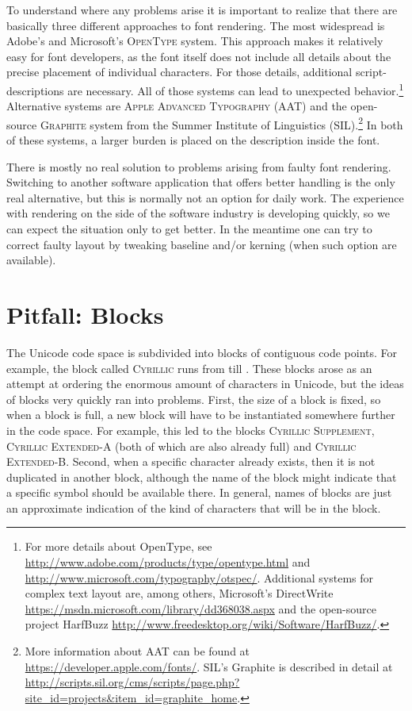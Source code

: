 To understand where any problems arise it is important to realize that there are
basically three different approaches to font rendering. The most widespread is
Adobe's and Microsoft's \textsc{OpenType} system. This approach makes it
relatively easy for font developers, as the font itself does not include all
details about the precise placement of individual characters. For those details,
additional script-descriptions are necessary. All of those systems can lead to
unexpected behavior.\footnote{For more details about OpenType, see
\url{http://www.adobe.com/products/type/opentype.html} and
\url{http://www.microsoft.com/typography/otspec/}. Additional systems for
complex text layout are, among others, Microsoft's DirectWrite
\url{https://msdn.microsoft.com/library/dd368038.aspx} and the open-source
project HarfBuzz \url{http://www.freedesktop.org/wiki/Software/HarfBuzz/}.}
Alternative systems are \textsc{Apple Advanced Typography} (AAT) and the
open-source \textsc{Graphite} system from the Summer Institute of Linguistics
(SIL).\footnote{More information about AAT can be found at
\url{https://developer.apple.com/fonts/}. \newline SIL's Graphite is described
in detail at
\url{http://scripts.sil.org/cms/scripts/page.php?site\_id=projects\&item\_id=graphite\_home}.}
In both of these systems, a larger burden is placed on the description inside
the font.

There is mostly no real solution to problems arising from faulty font rendering.
Switching to another software application that offers better handling is the
only real alternative, but this is normally not an option for daily work. The 
experience with rendering on the side of the software industry is developing 
quickly, so we can expect the situation only to get better. In the meantime one 
can try to correct faulty layout by tweaking baseline and/or kerning (when such 
option are available).

\section{Pitfall: Blocks}
\label{pitfall-blocks}

The Unicode code space is subdivided into blocks of contiguous code points. For
example, the block called \textsc{Cyrillic} runs from  till
. These blocks arose as an attempt at ordering the enormous amount of
characters in Unicode, but the ideas of blocks very quickly ran into problems.
First, the size of a block is fixed, so when a block is full, a new block will
have to be instantiated somewhere further in the code space. For example, this
led to the blocks \textsc{Cyrillic Supplement}, \textsc{Cyrillic Extended-A}
(both of which are also already full) and \textsc{Cyrillic Extended-B}. Second,
when a specific character already exists, then it is not duplicated in another
block, although the name of the block might indicate that a specific symbol
should be available there. In general, names of blocks are just an approximate
indication of the kind of characters that will be in the block.

